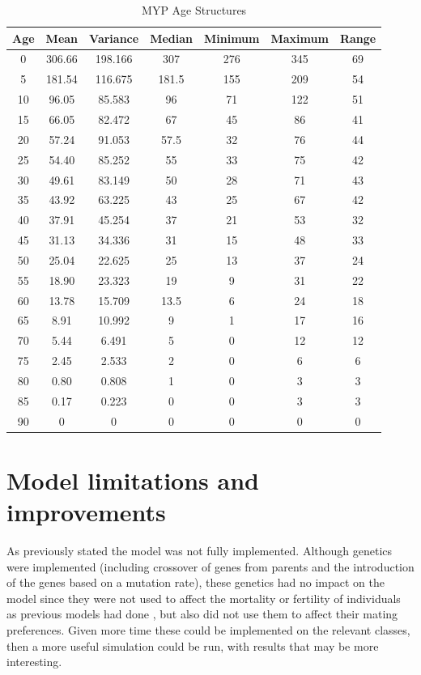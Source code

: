 \documentclass[authoryearcitations]{UoYCSproject}
\begin{document}
\begin{table}[h]
\caption{MYP Age Structures}
\label{tbl:mypAge}
\begin{tabular}{c c c c c c c}
\textbf{Age} & \textbf{Mean} & \textbf{Variance} & \textbf{Median} & \textbf{Minimum} & \textbf{Maximum} & \textbf{Range} \\\hline
0 & 306.66 & 198.166 & 307 & 276 & 345 & 69 \\\hline
5 & 181.54 & 116.675 & 181.5 & 155 & 209 & 54 \\\hline
10 & 96.05 & 85.583 & 96 & 71 & 122 & 51 \\\hline
15 & 66.05 & 82.472 & 67 & 45 & 86 & 41 \\\hline
20 & 57.24 & 91.053 & 57.5 & 32 & 76 & 44 \\\hline
25 & 54.40 & 85.252 & 55 & 33 & 75 & 42 \\\hline
30 & 49.61 & 83.149 & 50 & 28 & 71 & 43 \\\hline
35 & 43.92 & 63.225 & 43 & 25 & 67 & 42 \\\hline
40 & 37.91 & 45.254 & 37 & 21 & 53 & 32 \\\hline
45 & 31.13 & 34.336 & 31 & 15 & 48 & 33 \\\hline
50 & 25.04 & 22.625 & 25 & 13 & 37 & 24 \\\hline
55 & 18.90 & 23.323 & 19 & 9 & 31 & 22 \\\hline
60 & 13.78 & 15.709 & 13.5 & 6 & 24 & 18 \\\hline
65 & 8.91 & 10.992 & 9 & 1 & 17 & 16 \\\hline
70 & 5.44 & 6.491 & 5 & 0 & 12 & 12 \\\hline
75 & 2.45 & 2.533 & 2 & 0 & 6 & 6 \\\hline
80 & 0.80 & 0.808 & 1 & 0 & 3 & 3 \\\hline
85 & 0.17 & 0.223 & 0 & 0  & 3 & 3 \\\hline
90 & 0 & 0 & 0 & 0 & 0 & 0
\end{tabular}
\end{table}

\section{Model limitations and improvements}
As previously stated the model was not fully implemented. Although genetics were implemented (including crossover of genes from parents and the introduction of the genes based on a mutation rate), these genetics had no impact on the model since they were not used to affect the mortality or fertility of individuals as previous models had done \cite{mateChoice2013}, but also did not use them to affect their mating preferences. Given more time these could be implemented on the relevant classes, then a more useful simulation could be run, with results that may be more interesting.
\end{document}

